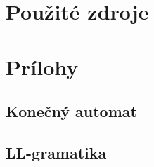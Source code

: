 \documentclass[11pt,a4paper]{article}
\begin{document}
\section{Použité zdroje}

\newpage
\section{Prílohy}


\subsection{Konečný automat}
\label{app:automat}


\newpage

\subsection{LL-gramatika}
\label{gramatika}
\end{document}
